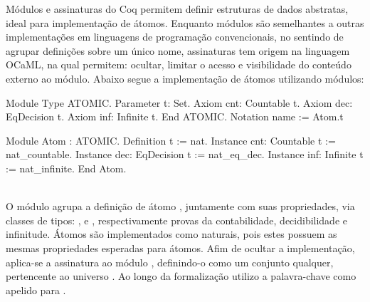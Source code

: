Módulos e assinaturas do Coq permitem definir estruturas de dados abstratas, ideal para implementação de átomos. Enquanto módulos são semelhantes a outras implementações em linguagens de programação convencionais, no sentindo de agrupar definições sobre um único nome, assinaturas tem origem na linguagem OCaML, na qual permitem: ocultar, limitar o acesso e visibilidade do conteúdo externo ao módulo. Abaixo segue a implementação de átomos utilizando módulos:
\vspace*{.4em}\\
\begin{minipage}[t]{0.5\linewidth}
\begin{coqcode}
Module Type ATOMIC.
  Parameter t: Set.
  Axiom cnt: Countable t.
  Axiom dec: EqDecision t.
  Axiom inf: Infinite t.
End ATOMIC.
Notation name := Atom.t
\end{coqcode}
\end{minipage}
\hspace{-5em}
\begin{minipage}[t]{0.5\linewidth}
\begin{coqcode}
Module Atom : ATOMIC.
  Definition t := nat.
  Instance cnt: Countable t := nat_countable.
  Instance dec: EqDecision t := nat_eq_dec.
  Instance inf: Infinite t := nat_infinite.
End Atom.
\end{coqcode}
\end{minipage}
\vspace*{1em}\\
O módulo  agrupa a definição de átomo , juntamente com suas propriedades, via classes de tipos: ,  e , respectivamente provas da contabilidade, decidibilidade e infinitude. Átomos são implementados como naturais, pois estes possuem as mesmas propriedades esperadas para átomos. Afim de ocultar a implementação, aplica-se a assinatura  ao módulo , definindo-o como um conjunto qualquer, pertencente ao universo . Ao longo da formalização utilizo a palavra-chave  como apelido para . 

